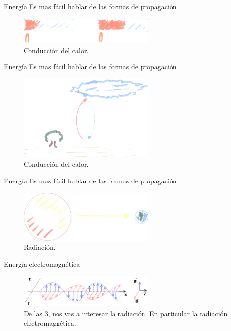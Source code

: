 \documentclass[handout]{beamer}
\begin{document}
\begin{frame}{Energía}
  Es mas fácil hablar de las formas de propagación
  \begin{figure}
    \includegraphics[width=0.6\textwidth]{imagenes/conduccion.png}
    \caption{Conducción del calor.}
  \end{figure}
\end{frame}

\begin{frame}{Energía}
  Es mas fácil hablar de las formas de propagación
  \begin{figure}
    \includegraphics[width=0.6\textwidth]{imagenes/conveccion.png}
    \caption{Conducción del calor.}
  \end{figure}
\end{frame}

\begin{frame}{Energía}
  Es mas fácil hablar de las formas de propagación
  \begin{figure}
    \includegraphics[width=0.6\textwidth]{imagenes/radiacion.png}
    \caption{Radiación.}
  \end{figure}
\end{frame}

\begin{frame}{Energía electromagnética}
  \begin{figure}
    \includegraphics[width=0.6\textwidth]{imagenes/Onde_electromagnetique.png}
    \caption{ De las 3, nos vas a interesar la radiación. En particular la radiación electromagnética.}
  \end{figure}
\end{frame}
\end{document}
